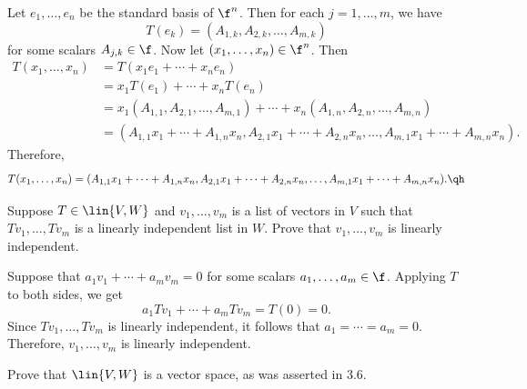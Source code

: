 \begin{sol}
    Let $e_1, \ldots, e_n$ be the standard basis of $\f^n$. Then for each $j = 1, \ldots, m$, we have
    \[T(e_k) = (A_{1, k}, A_{2, k}, \ldots, A_{m, k})\]
    for some scalars $A_{j, k} \in \f$. Now let $(x_1, \ldots, x_n) \in \f^n$. Then
    \begin{align*}
        T(x_1, \ldots, x_n) & = T(x_1 e_1 + \cdots + x_n e_n) \\
        & = x_1 T(e_1) + \cdots + x_n T(e_n) \\
        & = x_1 (A_{1, 1}, A_{2, 1}, \ldots, A_{m, 1}) + \cdots + x_n (A_{1, n}, A_{2, n}, \ldots, A_{m, n}) \\
        & = (A_{1, 1} x_1 + \cdots + A_{1, n} x_n, A_{2, 1} x_1 + \cdots + A_{2, n} x_n, \ldots, A_{m, 1} x_1 + \cdots + A_{m, n} x_n).
    \end{align*}
    Therefore,
    \[T(x_1, \ldots, x_n) = (A_{1, 1} x_1 + \cdots + A_{1, n} x_n, A_{2, 1} x_1 + \cdots + A_{2, n} x_n, \ldots, A_{m, 1} x_1 + \cdots + A_{m, n} x_n). \qh\]
\end{sol}

\begin{exercise}[3a4]
    Suppose $T \in \lin{V, W}$ and $v_1, \ldots, v_m$ is a list of vectors in $V$ such that $Tv_1, \ldots, Tv_m$ is a linearly independent list in $W$. Prove that $v_1, \ldots, v_m$ is linearly independent.
\end{exercise}

\begin{sol}
    Suppose that $a_1 v_1 + \cdots + a_m v_m = 0$ for some scalars $a_1, \ldots, a_m \in \f$. Applying $T$ to both sides, we get
    \[a_1 Tv_1 + \cdots + a_m Tv_m = T(0) = 0.\]
    Since $Tv_1, \ldots, Tv_m$ is linearly independent, it follows that $a_1 = \cdots = a_m = 0$. Therefore, $v_1, \ldots, v_m$ is linearly independent.
\end{sol}

\begin{exercise}[3a5]
    Prove that $\lin{V, W}$ is a vector space, as was asserted in 3.6.
\end{exercise}

